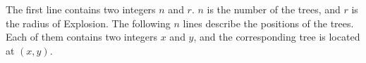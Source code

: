 The first line contains two integers $n$ and $r$.
$n$ is the number of the trees, and $r$ is the radius of Explosion.
The following $n$ lines describe the positions of the trees. 
Each of them contains two integers $x$ and $y$, 
and the corresponding tree is located at $(x,y)$.
